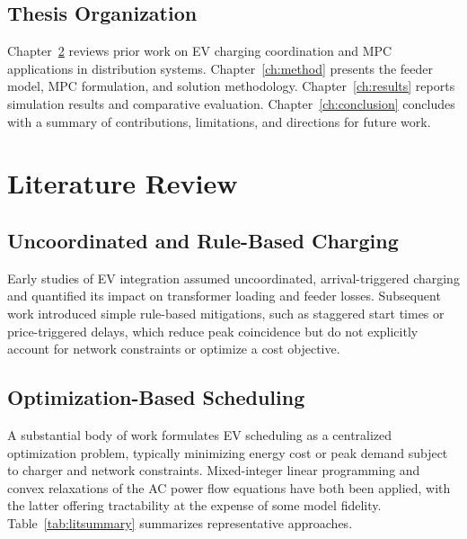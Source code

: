 \documentclass[12pt,twoside]{report}
\begin{document}
\section{Thesis Organization}
Chapter~\ref{ch:lit} reviews prior work on EV charging coordination and MPC applications in
distribution systems. Chapter~\ref{ch:method} presents the feeder model, MPC formulation, and
solution methodology. Chapter~\ref{ch:results} reports simulation results and comparative
evaluation. Chapter~\ref{ch:conclusion} concludes with a summary of contributions, limitations,
and directions for future work.

\chapter{Literature Review}
\label{ch:lit}

\section{Uncoordinated and Rule-Based Charging}
Early studies of EV integration assumed uncoordinated, arrival-triggered charging and
quantified its impact on transformer loading and feeder losses. Subsequent work introduced
simple rule-based mitigations, such as staggered start times or price-triggered delays, which
reduce peak coincidence but do not explicitly account for network constraints or optimize a
cost objective.

\section{Optimization-Based Scheduling}
A substantial body of work formulates EV scheduling as a centralized optimization problem,
typically minimizing energy cost or peak demand subject to charger and network constraints.
Mixed-integer linear programming and convex relaxations of the AC power flow equations have
both been applied, with the latter offering tractability at the expense of some model fidelity.
Table~\ref{tab:litsummary} summarizes representative approaches.
\end{document}
